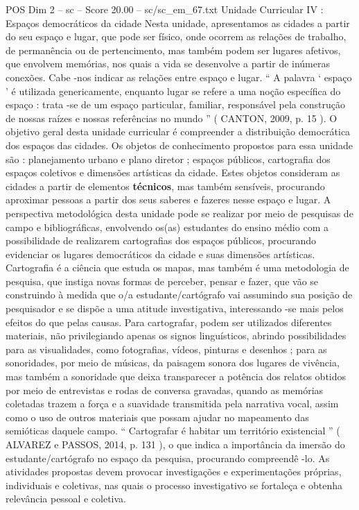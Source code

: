 \begin{textsample}{POS Dim 2 – sc – Score 20.00 – sc/sc\_em\_67.txt}
Unidade Curricular IV : Espaços democráticos da cidade Nesta unidade, apresentamos as cidades a partir do seu espaço e lugar, que pode ser físico, onde ocorrem as relações de trabalho, de permanência ou de pertencimento, mas também podem ser lugares afetivos, que envolvem memórias, nos quais a vida se desenvolve a partir de inúmeras conexões.
Cabe -nos indicar as relações entre espaço e lugar. “ A palavra ‘ espaço ’ é utilizada genericamente, enquanto lugar se refere a uma noção específica do espaço : trata -se de um espaço particular, familiar, responsável pela construção de nossas raízes e nossas referências no mundo ” ( CANTON, 2009, p. 15 ).
O objetivo geral desta unidade curricular é compreender a distribuição democrática dos espaços das cidades.
Os objetos de conhecimento propostos para essa unidade são : planejamento urbano e plano diretor ; espaços públicos, cartografia dos espaços coletivos e dimensões artísticas da cidade.
Estes objetos consideram as cidades a partir de elementos \textbf{técnicos}, mas também sensíveis, procurando aproximar pessoas a partir dos seus saberes e fazeres nesse espaço e lugar.
A perspectiva metodológica desta unidade pode se realizar por meio de pesquisas de campo e bibliográficas, envolvendo os(as) estudantes do ensino médio com a possibilidade de realizarem cartografias dos espaços públicos, procurando evidenciar os lugares democráticos da cidade e suas dimensões artísticas.
Cartografia é a ciência que estuda os mapas, mas também é uma metodologia de pesquisa, que instiga novas formas de perceber, pensar e fazer, que vão se construindo à medida que o/a estudante/cartógrafo vai assumindo sua posição de pesquisador e se dispõe a uma atitude investigativa, interessando -se mais pelos efeitos do que pelas causas.
Para cartografar, podem ser utilizados diferentes materiais, não privilegiando apenas os signos linguísticos, abrindo possibilidades para as visualidades, como fotografias, vídeos, pinturas e desenhos ; para as sonoridades, por meio de músicas, da paisagem sonora dos lugares de vivência, mas também a sonoridade que deixa transparecer a potência dos relatos obtidos por meio de entrevistas e rodas de conversa gravadas, quando as memórias coletadas trazem a força e a suavidade transmitida pela narrativa vocal, assim como o uso de outros materiais que possam ajudar no mapeamento das semióticas daquele campo. “ Cartografar é habitar um território existencial ” ( ALVAREZ e PASSOS, 2014, p. 131 ), o que indica a importância da imersão do estudante/cartógrafo no espaço da pesquisa, procurando compreendê -lo.
As atividades propostas devem provocar investigações e experimentações próprias, individuais e coletivas, nas quais o processo investigativo se fortaleça e obtenha relevância pessoal e coletiva.

\end{textsample}

